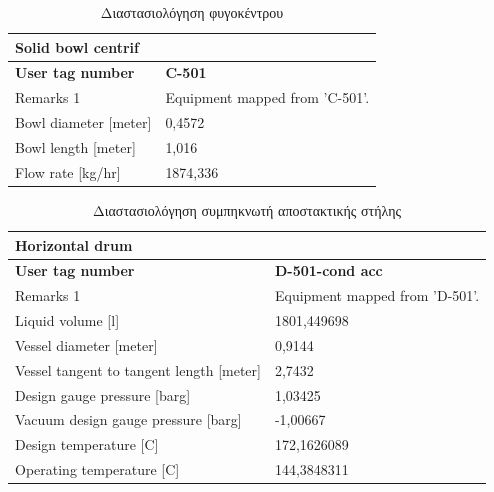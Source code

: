 \documentclass[11pt]{article}
\begin{document}
\begin{table}[htbp]
\caption{Διαστασιολόγηση φυγοκέντρου}
\centering
\begin{tabular}{ll}
\textbf{Solid bowl centrif} & \\
\hline
\textbf{User tag number} & \textbf{C-501}\\
Remarks 1 & Equipment mapped from 'C-501'.\\
Bowl diameter [meter] & 0,4572\\
Bowl length [meter] & 1,016\\
Flow rate [kg/hr] & 1874,336\\
\end{tabular}
\end{table}


\begin{table}[htbp]
\caption{Διαστασιολόγηση συμπηκνωτή αποστακτικής στήλης}
\centering
\begin{tabular}{ll}
\textbf{Horizontal drum} & \\
\hline
\textbf{User tag number} & \textbf{D-501-cond acc}\\
Remarks 1 & Equipment mapped from 'D-501'.\\
Liquid volume [l] & 1801,449698\\
Vessel diameter [meter] & 0,9144\\
Vessel tangent to tangent length [meter] & 2,7432\\
Design gauge pressure [barg] & 1,03425\\
Vacuum design gauge pressure [barg] & -1,00667\\
Design temperature [C] & 172,1626089\\
Operating temperature [C] & 144,3848311\\
\end{tabular}
\end{table}
\end{document}
